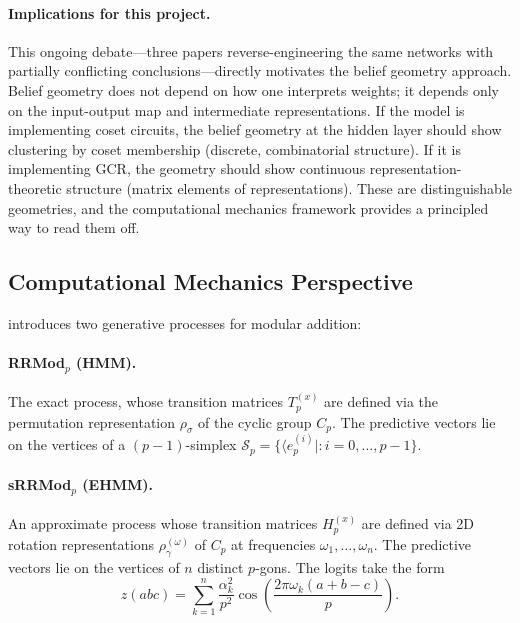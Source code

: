 \documentclass[11pt,a4paper]{article}
\begin{document}
\paragraph{Implications for this project.} This ongoing debate---three papers reverse-engineering the same networks with partially conflicting conclusions---directly motivates the belief geometry approach. Belief geometry does not depend on how one interprets weights; it depends only on the input-output map and intermediate representations. If the model is implementing coset circuits, the belief geometry at the hidden layer should show clustering by coset membership (discrete, combinatorial structure). If it is implementing GCR, the geometry should show continuous representation-theoretic structure (matrix elements of representations). These are distinguishable geometries, and the computational mechanics framework provides a principled way to read them off.

\subsection{Computational Mechanics Perspective}

\citet{poncini2025compmech} introduces two generative processes for modular addition:

\paragraph{RRMod$_p$ (HMM).} The exact process, whose transition matrices $T^{(x)}_p$ are defined via the permutation representation $\rho_\sigma$ of the cyclic group $C_p$. The predictive vectors lie on the vertices of a $(p{-}1)$-simplex $\mathcal{S}_p = \{\langle e^{(i)}_p | : i = 0, \ldots, p{-}1\}$.

\paragraph{sRRMod$_p$ (EHMM).} An approximate process whose transition matrices $H^{(x)}_p$ are defined via 2D rotation representations $\rho_{\gamma}^{(\omega)}$ of $C_p$ at frequencies $\omega_1, \ldots, \omega_n$. The predictive vectors lie on the vertices of $n$ distinct $p$-gons. The logits take the form
\begin{equation}\label{eq:logits}
    z(abc) = \sum_{k=1}^{n} \frac{\alpha_k^2}{p^2} \cos\!\left(\frac{2\pi \omega_k (a + b - c)}{p}\right).
\end{equation}
\end{document}
